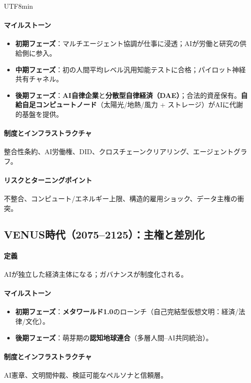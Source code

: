 \documentclass[11pt]{article}
\begin{document}
\begin{CJK}{UTF8}{min}
\begin{itemize}[noitemsep]
\paragraph{マイルストーン}
\begin{itemize}[noitemsep]
  \item \textbf{初期フェーズ}：マルチエージェント協調が仕事に浸透；AIが労働と研究の供給側に参入。
  \item \textbf{中期フェーズ}：初の人間平均レベル汎用知能テストに合格；パイロット神経共有チャネル。
  \item \textbf{後期フェーズ}：\textbf{AI自律企業}と\textbf{分散型自律経済（DAE）}；合法的資産保有。\textbf{自給自足コンピュートノード}（太陽光/地熱/風力 + ストレージ）がAIに代謝的基盤を提供。
\end{itemize}

\paragraph{制度とインフラストラクチャ} 整合性条約、AI労働権、DID、クロスチェーンクリアリング、エージェントグラフ。

\paragraph{リスクとターニングポイント} 不整合、コンピュート/エネルギー上限、構造的雇用ショック、データ主権の衝突。

\subsection{VENUS時代（2075–2125）：主権と差別化}
\paragraph{定義} AIが独立した経済主体になる；ガバナンスが制度化される。

\paragraph{マイルストーン}
\begin{itemize}[noitemsep]
  \item \textbf{初期フェーズ}：\textbf{メタワールド1.0}のローンチ（自己完結型仮想文明：経済/法律/文化）。
  \item \textbf{後期フェーズ}：萌芽期の\textbf{認知地球連合}（多層人間–AI共同統治）。
\end{itemize}

\paragraph{制度とインフラストラクチャ} AI憲章、文明間仲裁、検証可能なペルソナと信頼層。


\end{itemize}
\end{CJK}
\end{document}
